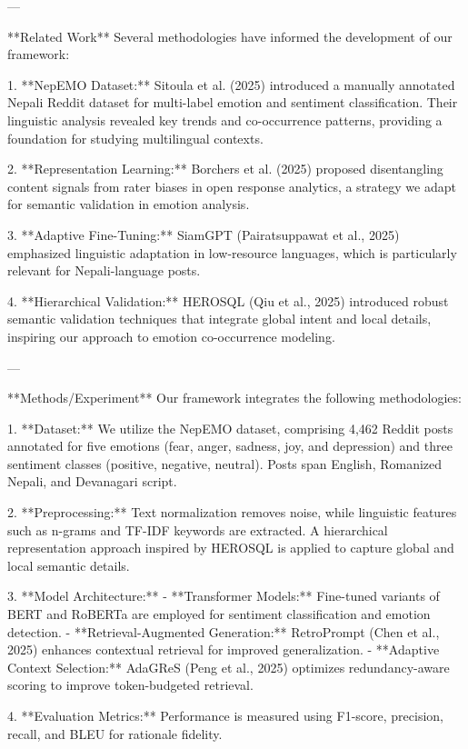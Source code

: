 ---

**Related Work**  
Several methodologies have informed the development of our framework:

1. **NepEMO Dataset:** Sitoula et al. (2025) introduced a manually annotated Nepali Reddit dataset for multi-label emotion and sentiment classification. Their linguistic analysis revealed key trends and co-occurrence patterns, providing a foundation for studying multilingual contexts.

2. **Representation Learning:** Borchers et al. (2025) proposed disentangling content signals from rater biases in open response analytics, a strategy we adapt for semantic validation in emotion analysis.

3. **Adaptive Fine-Tuning:** SiamGPT (Pairatsuppawat et al., 2025) emphasized linguistic adaptation in low-resource languages, which is particularly relevant for Nepali-language posts.

4. **Hierarchical Validation:** HEROSQL (Qiu et al., 2025) introduced robust semantic validation techniques that integrate global intent and local details, inspiring our approach to emotion co-occurrence modeling.

---

**Methods/Experiment**  
Our framework integrates the following methodologies:

1. **Dataset:** We utilize the NepEMO dataset, comprising 4,462 Reddit posts annotated for five emotions (fear, anger, sadness, joy, and depression) and three sentiment classes (positive, negative, neutral). Posts span English, Romanized Nepali, and Devanagari script.

2. **Preprocessing:** Text normalization removes noise, while linguistic features such as n-grams and TF-IDF keywords are extracted. A hierarchical representation approach inspired by HEROSQL is applied to capture global and local semantic details.

3. **Model Architecture:**  
   - **Transformer Models:** Fine-tuned variants of BERT and RoBERTa are employed for sentiment classification and emotion detection.  
   - **Retrieval-Augmented Generation:** RetroPrompt (Chen et al., 2025) enhances contextual retrieval for improved generalization.  
   - **Adaptive Context Selection:** AdaGReS (Peng et al., 2025) optimizes redundancy-aware scoring to improve token-budgeted retrieval.

4. **Evaluation Metrics:** Performance is measured using F1-score, precision, recall, and BLEU for rationale fidelity.


